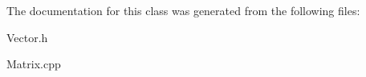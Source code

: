 The documentation for this class was generated from the following files\+:\begin{DoxyCompactItemize}
\item 
Vector.\+h\item 
Matrix.\+cpp\end{DoxyCompactItemize}

